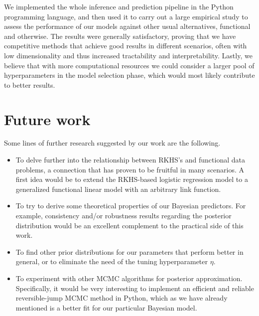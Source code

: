 We implemented the whole inference and prediction pipeline in the Python programming language, and then used it to carry out a large empirical study to assess the performance of our models against other usual alternatives, functional and otherwise. The results were generally satisfactory, proving that we have competitive methods that achieve good results in different scenarios, often with low dimensionality and thus increased tractability and interpretability. Lastly, we believe that with more computational resources we could consider a larger pool of hyperparameters in the model selection phase, which would most likely contribute to better results.

\section{Future work}

Some lines of further research suggested by our work are the following.

\begin{itemize}
  \item To delve further into the relationship between RKHS's and functional data problems, a connection that has proven to be fruitful in many scenarios. A first idea would be to extend the RKHS-based logistic regression model to a generalized functional linear model with an arbitrary link function.
  \item To try to derive some theoretical properties of our Bayesian predictors. For example, consistency and/or robustness results regarding the posterior distribution would be an excellent complement to the practical side of this work.
  \item To find other prior distributions for our parameters that perform better in general, or to eliminate the need of the tuning hyperparameter \(\eta\).
  \item To experiment with other MCMC algorithms for posterior approximation. Specifically, it would be very interesting to implement an efficient and reliable reversible-jump MCMC method in Python, which as we have already mentioned is a better fit for our particular Bayesian model.
\end{itemize}
